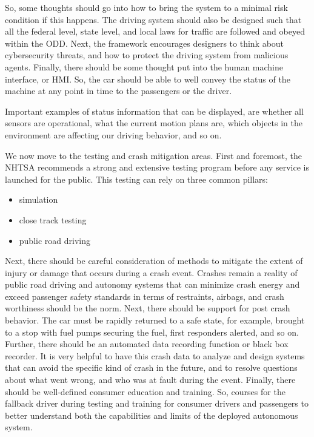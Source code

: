 So, some thoughts should go into how to bring the system to a minimal risk condition if this happens. 
The driving system should also be designed such that all the federal level, state level, and local laws for traffic 
are followed and obeyed within the ODD. Next, the framework encourages designers to think about cybersecurity threats, 
and how to protect the driving system from malicious agents. Finally, there should be some thought put into the human machine interface, or HMI. 
So, the car should be able to well convey the status of the machine at any point in time to the passengers or the driver. 

Important examples of status information that can be displayed, are whether all sensors are operational, 
what the current motion plans are, which objects in the environment are affecting our driving behavior, and so on. 

We now move to the testing and crash mitigation areas. First and foremost, the NHTSA recommends a strong and extensive testing program before any service is launched for the public. 
This testing can rely on three common pillars:

\begin{itemize}
\item simulation
\item close track testing
\item public road driving
\end{itemize}

Next, there should be careful consideration of methods to mitigate the extent of injury or damage that occurs during a crash event. 
Crashes remain a reality of public road driving and autonomy systems that can minimize crash energy 
and exceed passenger safety standards in terms of restraints, airbags, and crash worthiness should be the norm. 
Next, there should be support for post crash behavior. The car must be rapidly returned to a safe state, 
for example, brought to a stop with fuel pumps securing the fuel, 
first responders alerted, and so on. Further, there should be an automated data recording function or black box recorder. 
It is very helpful to have this crash data to analyze and design systems that can avoid the specific kind of crash in the future, and to resolve questions about what went wrong, 
and who was at fault during the event. Finally, there should be well-defined consumer education and training. 
So, courses for the fallback driver during testing and training for consumer drivers and passengers to better understand both the capabilities and limits of the deployed autonomous system. 

